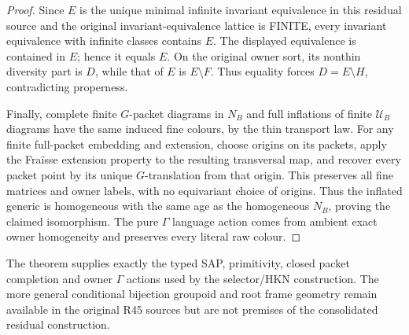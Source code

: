\begin{proof}
Since \(E\) is the unique
minimal infinite invariant
equivalence in this residual
source and the original
invariant-equivalence lattice
is FINITE, every invariant
equivalence with infinite
classes contains \(E\).
The displayed equivalence
is contained in \(E\);
hence it equals \(E\).
On the original owner sort,
its nonthin diversity part
is \(D\), while that of \(E\)
is \(E\setminus F\).
Thus equality forces
\(D=E\setminus H\),
contradicting properness.

Finally, complete finite $G$-packet diagrams in $N_B$
and full inflations of finite $\mathcal U_B$ diagrams
have the same induced fine colours, by the thin transport
law.  For any finite full-packet embedding and extension,
choose origins on its packets, apply the Fra\"isse
extension property to the resulting transversal map,
and recover every packet point by its unique $G$-translation
from that origin.  This preserves all fine matrices and
owner labels, with no equivariant choice of origins.
Thus the inflated generic is homogeneous with the same age
as the homogeneous $N_B$, proving the claimed isomorphism.
The pure $\Gamma$ language action comes from ambient exact
owner homogeneity and preserves every literal raw colour.
\end{proof}

\begin{remark}
The theorem supplies exactly the typed SAP, primitivity,
closed packet completion and owner $\Gamma$ actions used by
the selector/HKN construction.  The more general conditional
bijection groupoid and root frame geometry remain available in
the original R45 sources but are not premises of the
consolidated residual construction.
\end{remark}
